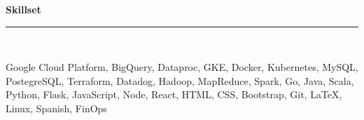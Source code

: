 \documentclass[a4paper,10pt]{article}
\newcommand{\horizontalline}{{\rule{533pt}{0.625pt}\\}}
\renewcommand{\section}[1]{{\noindent\textbf{\large #1}\\\horizontalline}}
\begin{document}
\section{Skillset}
Google Cloud Platform, BigQuery, Dataproc, GKE, Docker, Kubernetes, MySQL, PostegreSQL, Terraform, Datadog, Hadoop, MapReduce, Spark, Go, Java, Scala, Python, Flask, JavaScript, Node, React, HTML, CSS, Bootstrap, Git, \LaTeX, Linux, Spanish, FinOps\\
\end{document}
